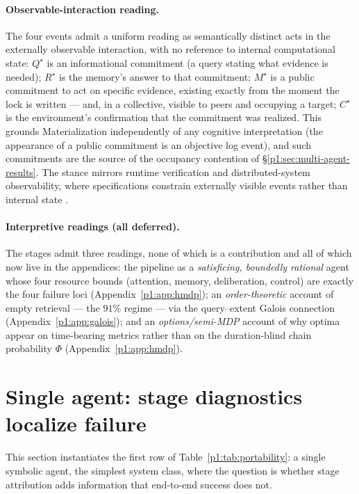 \documentclass{article}
\begin{document}
\paragraph{Observable-interaction reading.} The four events admit a
uniform reading as semantically distinct acts in the externally
observable interaction, with no reference to internal computational
state: $Q^\star$ is an informational commitment (a query stating what
evidence is needed); $R^\star$ is the memory's answer to that
commitment; $M^\star$ is a public commitment to act on specific
evidence, existing exactly from the moment the lock is written ---
and, in a collective, visible to peers and occupying a target;
$C^\star$ is the environment's confirmation that the commitment was
realized. This grounds Materialization independently of any cognitive
interpretation (the appearance of a public commitment is an objective
log event), and such commitments are the source of the
occupancy contention of \S\ref{p1:sec:multi-agent-results}. The stance
mirrors runtime verification and distributed-system observability,
where specifications constrain externally visible events rather than
internal state \citep{leucker2009runtime}.

\paragraph{Interpretive readings (all deferred).} The stages admit
three readings, none of which is a contribution and all of which now
live in the appendices: the pipeline as a \emph{satisficing, boundedly
rational} agent whose four resource bounds (attention, memory,
deliberation, control) are exactly the four failure loci
(Appendix~\ref{p1:app:hmdp}); an \emph{order-theoretic} account of empty
retrieval --- the $91\%$ regime --- via the query--extent Galois
connection (Appendix~\ref{p1:app:galois}); and an \emph{options/semi-MDP}
account of why optima appear on time-bearing metrics rather than on
the duration-blind chain probability $\Phi$
(Appendix~\ref{p1:app:hmdp}).

\section{Single agent: stage diagnostics localize failure}
\label{p1:sec:single}

This section instantiates the first row of
Table~\ref{p1:tab:portability}: a single symbolic agent, the simplest
system class, where the question is whether stage attribution adds
information that end-to-end success does not.
\end{document}
